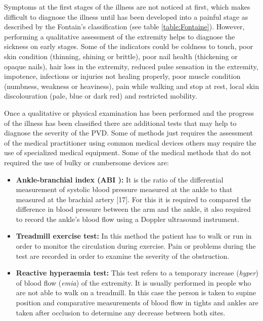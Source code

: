 Symptoms at the first stages of the illness are not noticed at first, which makes difficult to diagnose the illness until has been developed into a painful stage as described by the Fontain's classification (see table \ref{table:Fontaine}). However, performing a qualitative assessment of the extremity helps to diagnose the sickness on early stages. Some of the indicators could be coldness to touch, poor skin condition (thinning, shining or brittle), poor nail health (thickening or opaque nails), hair loss in the extremity, reduced pulse sensation in the extremity, impotence, infections or injuries not healing properly, poor muscle condition (numbness, weakness or heaviness), pain while walking and stop at rest, local skin discolouration (pale, blue or dark red) and restricted mobility. 

Once a qualitative or physical examination has been performed and the progress of the illness has been classified there are additional tests that may help to diagnose the severity of the PVD. Some of methods just requires the assessment of the medical practitioner using common medical devices others may require the use of specialized medical equipment. Some of the medical methods that do not required the use of bulky or cumbersome devices are:

\begin{itemize}

	\item \textbf{Ankle-branchial index (ABI ):} It is the ratio of the differential measurement of systolic blood pressure measured at the ankle to that measured at the brachial artery [17]. For this it is required to compared the difference in blood pressure between the arm and the ankle, it also required to record the ankle's blood flow using a Doppler ultrasound instrument.  
	\item \textbf{Treadmill exercise test: }In this method the patient has to walk or run in order to monitor the circulation during exercise. Pain or problems during the test are recorded in order to examine the severity of the obstruction.
	\item \textbf{Reactive hyperaemia test:} This test refers to a temporary increase (\textit{hyper}) of blood flow (\textit{emia}) of the extremity. It is usually performed in people who are not able to walk on a treadmill. In this case the person is taken to supine position and comparative measurements of blood flow in tights and ankles are taken after occlusion to determine any decrease between both sites. 

\end{itemize}



